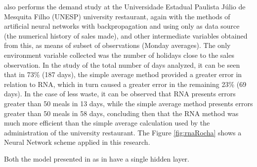          also performs the demand study at the Universidade Estadual Paulista Júlio de Mesquita Filho (UNESP) university restaurant, again with the methods of artificial neural networks with backpropagation and using only as data source (the numerical history of sales made), and other intermediate variables obtained from this, as means of subset of observations (Monday averages). The only environment variable collected was the number of holidays close to the sales observation. In the study of the total number of days analyzed, it can be seen that in 73\% (187 days), the simple average method provided a greater error in relation to RNA, which in turn caused a greater error in the remaining 23\% (69 days). In the case of less waste, it can be observed that RNA presents errors greater than 50 meals in 13 days, while the simple average method presents errors greater than 50 meals in 58 days, concluding then that the RNA method was much more efficient than the simple average calculation used by the administration of the university restaurant. The Figure \ref{fig:rnaRocha} shows a Neural Network scheme applied in this research. 
        \begin{figure}[h]
        \end{figure}
        
        Both the model presented in \cite{Rocha2011} as in \cite{Lopes2008} have a single hidden layer.
      
